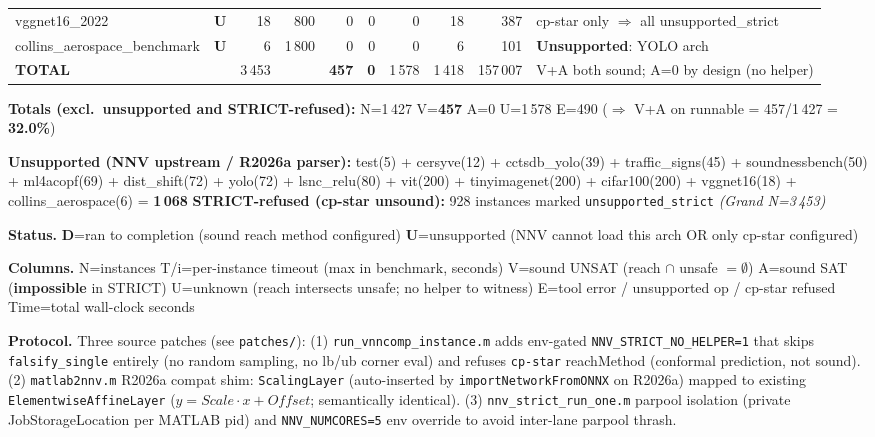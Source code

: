 \documentclass[10pt]{beamer}
\newcommand{\sdone}{{\color{cdone}\textbf{D}}}
\newcommand{\sunsup}{{\color{cunsup}\textbf{U}}}
\begin{document}
\begin{frame}[fragile]
\begin{tabular}{l c r r r r r r r l}
vggnet16\_2022                    & \sunsup & 18    & 800     & 0           & 0   & 0     & 18  & 387     & cp-star only $\Rightarrow$ all unsupported\_strict \\
collins\_aerospace\_benchmark     & \sunsup & 6     & 1\,800  & 0           & 0   & 0     & 6   & 101     & \textbf{Unsupported}: YOLO arch \\
\midrule
\textbf{TOTAL}                    &         & 3\,453 &        & \textbf{457} & \textbf{0} & 1\,578 & 1\,418 & 157\,007 & V+A both sound; A=0 by design (no helper) \\
\bottomrule
\end{tabular}

\vspace{0.4em}
\centering\scriptsize
\textbf{Totals (excl.\ unsupported and STRICT-refused):} \quad
N=1\,427 \quad V=\textbf{457} \quad A=0 \quad U=1\,578 \quad E=490 \quad
($\Rightarrow$ V+A on runnable = 457/1\,427 = \textbf{32.0\%})

\textbf{Unsupported (NNV upstream / R2026a parser):} test(5) + cersyve(12) + cctsdb\_yolo(39) +
traffic\_signs(45) + soundnessbench(50) + ml4acopf(69) + dist\_shift(72) + yolo(72) +
lsnc\_relu(80) + vit(200) + tinyimagenet(200) + cifar100(200) + vggnet16(18) +
collins\_aerospace(6) = \textbf{1\,068} \quad
\textbf{STRICT-refused (cp-star unsound):} 928 instances marked \texttt{unsupported\_strict}
\quad \emph{(Grand N=3\,453)}

\vspace{0.3em}
\centering\scriptsize
\textbf{Status.}\;
\sdone{}=ran to completion (sound reach method configured) \quad
\sunsup{}=unsupported (NNV cannot load this arch OR only cp-star configured)

\vspace{0.2em}
\centering\scriptsize
\textbf{Columns.}\;
N=instances\quad
T/i=per-instance timeout (max in benchmark, seconds)\quad
V=sound UNSAT (reach $\cap$ unsafe $= \emptyset$)\quad
A=sound SAT (\textbf{impossible} in STRICT)\quad
U=unknown (reach intersects unsafe; no helper to witness)\quad
E=tool error / unsupported op / cp-star refused\quad
Time=total wall-clock seconds

\vspace{0.2em}
\centering\scriptsize
\textbf{Protocol.}\;
Three source patches (see \texttt{patches/}):
(1) \texttt{run\_vnncomp\_instance.m} adds env-gated \texttt{NNV\_STRICT\_NO\_HELPER=1} that
skips \texttt{falsify\_single} entirely (no random sampling, no lb/ub corner eval) and refuses
\texttt{cp-star} reachMethod (conformal prediction, not sound).
(2) \texttt{matlab2nnv.m} R2026a compat shim: \texttt{ScalingLayer} (auto-inserted by
\texttt{importNetworkFromONNX} on R2026a) mapped to existing \texttt{ElementwiseAffineLayer}
($y=Scale\cdot x+Offset$; semantically identical).
(3) \texttt{nnv\_strict\_run\_one.m} parpool isolation (private JobStorageLocation per
MATLAB pid) and \texttt{NNV\_NUMCORES=5} env override to avoid inter-lane parpool thrash.

\end{frame}
\end{document}
